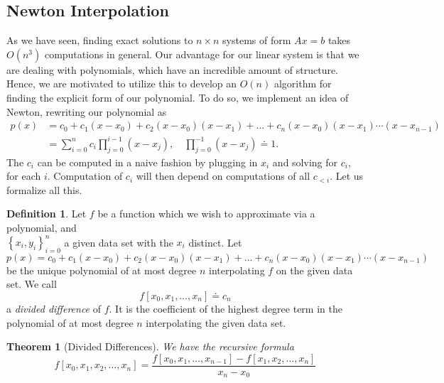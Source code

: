 \documentclass[12pt]{article}
\theoremstyle{plain}
\newtheorem{theorem}{Theorem}
\theoremstyle{definition}
\newtheorem*{definition}{Definition}
\theoremstyle{remark}
\numberwithin{equation}{section}  %
\begin{document}
		\subsection{Newton Interpolation}
		As we have seen, finding exact solutions to $n \times n$
		systems of form $Ax = b$ takes $O(n^3)$ computations in general.
		Our advantage for our linear system is that we are dealing with polynomials,
		which have an incredible amount of structure. Hence, we are motivated
		to utilize this to develop an $O(n)$ algorithm for finding the explicit
		form of our polynomial. 
		To do so, we implement an idea of Newton, rewriting our polynomial as
		\begin{align*}
			p(x) &= c_0 + c_1(x - x_0) + c_2(x - x_0)(x - x_1) + \ldots
			+ c_{n}(x - x_0)(x - x_1)\cdots(x - x_{n-1})
			\\
			& = \sum_{i=0}^{n} c_i \prod_{j=0}^{i-1} (x - x_j), \quad \prod_{j=0}^{-1}
			(x - x_j) \doteq 1.
		\end{align*}
		The $c_i$ can be computed in a naive fashion by plugging in $x_i$ 
		and solving for $c_i$, for each $i$. Computation of $c_i$ will then depend
		on computations of all $c_{< i}$. Let us formalize all this. 
		\begin{definition}
			Let $f$ be a function which we wish to approximate via a polynomial,
			and \\ $ \left\{ x_i, y_i \right\}_{i=0}^{n} $ a given data set with the
			$x_i$ distinct. Let
			\begin{equation*}
				p(x) = c_0 + c_1(x - x_0) + c_2(x - x_0)(x - x_1) + \ldots
				+ c_{n}(x - x_0)(x - x_1)\cdots(x - x_{n-1})
			\end{equation*}
			be the unique polynomial of at most degree $n$ interpolating $f$
			on the given data set. We call
			\begin{equation*}
				f[x_0, x_1, \ldots, x_n] \doteq c_n
			\end{equation*}
			a \emph{divided difference} of $f$. It is the coefficient of the
			highest degree term in the polynomial of at most degree $n$ interpolating the
			given data set. 
		\end{definition}
		\begin{theorem}[Divided Differences]
			We have the recursive formula
			\begin{equation*}
				f[x_0, x_1, x_2, \ldots, x_n] = \frac{f[x_0, x_1, \ldots, x_{n-1}] - f[x_1, x_2, \ldots, x_n]}{x_n - x_0}
			\end{equation*}
		\end{theorem}
\end{document}
